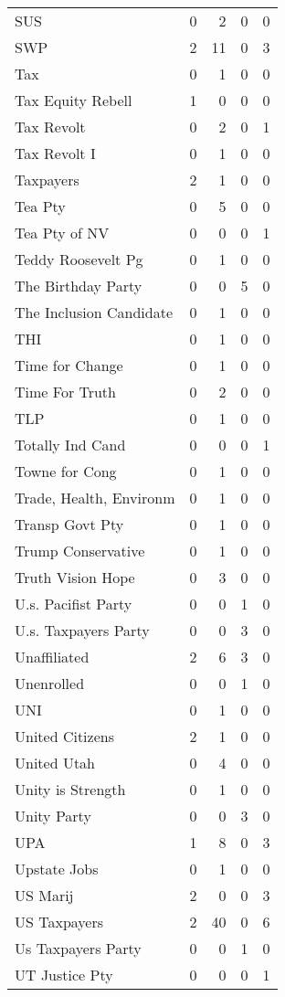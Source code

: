 \begin{supertabular}{lrrrr}
SUS & 0 & 2 & 0 & 0\\
SWP & 2 & 11 & 0 & 3\\
Tax & 0 & 1 & 0 & 0\\
Tax Equity Rebell & 1 & 0 & 0 & 0\\
Tax Revolt & 0 & 2 & 0 & 1\\
Tax Revolt I & 0 & 1 & 0 & 0\\
Taxpayers & 2 & 1 & 0 & 0\\
Tea Pty & 0 & 5 & 0 & 0\\
Tea Pty of NV & 0 & 0 & 0 & 1\\
Teddy Roosevelt Pg & 0 & 1 & 0 & 0\\
The Birthday Party & 0 & 0 & 5 & 0\\
The Inclusion Candidate & 0 & 1 & 0 & 0\\
THI & 0 & 1 & 0 & 0\\
Time for Change & 0 & 1 & 0 & 0\\
Time For Truth & 0 & 2 & 0 & 0\\
TLP & 0 & 1 & 0 & 0\\
Totally Ind Cand & 0 & 0 & 0 & 1\\
Towne for Cong & 0 & 1 & 0 & 0\\
Trade, Health, Environm & 0 & 1 & 0 & 0\\
Transp Govt Pty & 0 & 1 & 0 & 0\\
Trump Conservative & 0 & 1 & 0 & 0\\
Truth Vision Hope & 0 & 3 & 0 & 0\\
U.s. Pacifist Party & 0 & 0 & 1 & 0\\
U.s. Taxpayers Party & 0 & 0 & 3 & 0\\
Unaffiliated & 2 & 6 & 3 & 0\\
Unenrolled & 0 & 0 & 1 & 0\\
UNI & 0 & 1 & 0 & 0\\
United Citizens & 2 & 1 & 0 & 0\\
United Utah & 0 & 4 & 0 & 0\\
Unity is Strength & 0 & 1 & 0 & 0\\
Unity Party & 0 & 0 & 3 & 0\\
UPA & 1 & 8 & 0 & 3\\
Upstate Jobs & 0 & 1 & 0 & 0\\
US Marij & 2 & 0 & 0 & 3\\
US Taxpayers & 2 & 40 & 0 & 6\\
Us Taxpayers Party & 0 & 0 & 1 & 0\\
UT Justice Pty & 0 & 0 & 0 & 1\\

\end{supertabular}
